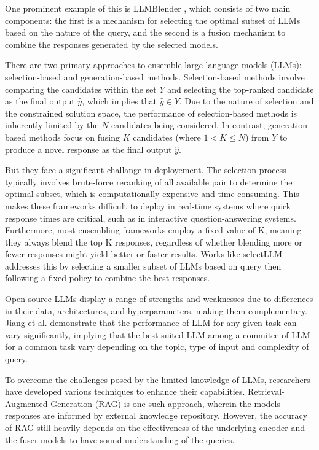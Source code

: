 \documentclass[sigconf,authordraft]{acmart}
\begin{document}
One prominent example of this is LLMBlender \cite{jiang-etal-2023-llm}, which consists of two main components: the first is a mechanism for selecting the optimal subset of LLMs based on the nature of the query, and the second is a fusion mechanism to combine the responses generated by the selected models.

There are two primary approaches to ensemble large language models (LLMs): selection-based and generation-based methods. Selection-based methods involve comparing the candidates within the set \( Y \) and selecting the top-ranked candidate as the final output \( \hat{y} \), which implies that \( \hat{y} \in Y \). Due to the nature of selection and the constrained solution space, the performance of selection-based methods is inherently limited by the \( N \) candidates being considered. In contrast, generation-based methods focus on fusing \( K \) candidates (where \( 1 < K \leq N \)) from \( Y \) to produce a novel response as the final output \( \hat{y} \).

But they face a significant challange in deployement. The selection process typically involves brute-force reranking of all available pair to determine the optimal subset, which is computationally expensive and time-consuming. This makes these frameworks difficult to deploy in real-time systems where quick response times are critical, such as in interactive question-answering systems. Furthermore, most ensembling frameworks employ a fixed value of K, meaning they always blend the top K responses, regardless of whether blending more or fewer responses might yield better or faster results. Works like selectLLM addresses this by selecting a smaller subset of LLMs based on query then following a fixed policy to combine the best responses.

Open-source LLMs display a range of strengths and weaknesses due to differences in their data, architectures, and hyperparameters, making them complementary. 
Jiang et al. \cite{jiang-etal-2023-llm} demonstrate that the performance of LLM for any given task can vary significantly, implying that the best suited LLM among a commitee of LLM for a common task vary depending on the topic, type of input and complexity of query. 

To overcome the challenges posed by the limited knowledge of LLMs, researchers have developed various techniques to enhance their capabilities. Retrieval-Augmented Generation (RAG) \cite{lewis2020retrieval} is one such approach, wherein the models responses are informed by external knowledge repository. However, the accuracy of RAG still heavily depends on the effectiveness of the underlying encoder and the fuser models to have sound understanding of the queries. 
\end{document}
